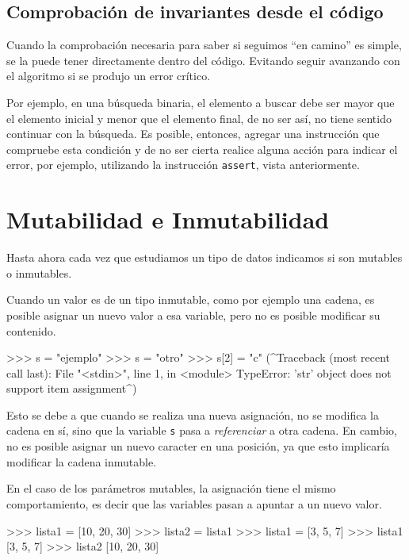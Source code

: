 \subsection{Comprobación de invariantes desde el código}

Cuando la comprobación necesaria para saber si seguimos ``en camino'' es simple,
se la puede tener directamente dentro del código.  Evitando seguir avanzando
con el algoritmo si se produjo un error crítico.

Por ejemplo, en una búsqueda binaria, el elemento a buscar debe ser mayor que
el elemento inicial y menor que el elemento final, de no ser así, no tiene sentido
continuar con la búsqueda.  Es posible, entonces, agregar una instrucción
que compruebe esta condición y de no ser cierta realice alguna acción para
indicar el error, por ejemplo, utilizando la instrucción \lstinline!assert!,
vista anteriormente.

\section{Mutabilidad e Inmutabilidad}
\label{mutabilidad}

Hasta ahora cada vez que estudiamos un tipo de datos indicamos si son
mutables o inmutables.

Cuando un valor es de un tipo inmutable, como por ejemplo una cadena, es
posible asignar un nuevo valor a esa variable, pero no es posible modificar su
contenido.

\begin{codigo-python-sn}
>>> s = "ejemplo"
>>> s = "otro"
>>> s[2] = "c"
(^Traceback (most recent call last):
  File "<stdin>", line 1, in <module>
TypeError: 'str' object does not support item assignment^)
\end{codigo-python-sn}

Esto se debe a que cuando se realiza una nueva asignación, no se modifica la
cadena en sí, sino que la variable \lstinline!s! pasa a \emph{referenciar} a otra cadena.
En cambio, no es posible asignar un nuevo caracter en una posición, ya que
esto implicaría modificar la cadena inmutable.

En el caso de los parámetros mutables, la asignación tiene el mismo
comportamiento, es decir que las variables pasan a apuntar a un nuevo valor.

\begin{codigo-python-sn}
>>> lista1 = [10, 20, 30]
>>> lista2 = lista1
>>> lista1 = [3, 5, 7]
>>> lista1
[3, 5, 7]
>>> lista2
[10, 20, 30]
\end{codigo-python-sn}

